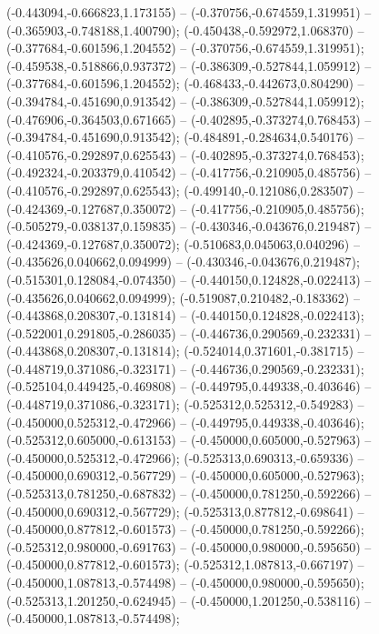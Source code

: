  (-0.443094,-0.666823,1.173155) -- (-0.370756,-0.674559,1.319951) -- (-0.365903,-0.748188,1.400790);
 (-0.450438,-0.592972,1.068370) -- (-0.377684,-0.601596,1.204552) -- (-0.370756,-0.674559,1.319951);
 (-0.459538,-0.518866,0.937372) -- (-0.386309,-0.527844,1.059912) -- (-0.377684,-0.601596,1.204552);
 (-0.468433,-0.442673,0.804290) -- (-0.394784,-0.451690,0.913542) -- (-0.386309,-0.527844,1.059912);
 (-0.476906,-0.364503,0.671665) -- (-0.402895,-0.373274,0.768453) -- (-0.394784,-0.451690,0.913542);
 (-0.484891,-0.284634,0.540176) -- (-0.410576,-0.292897,0.625543) -- (-0.402895,-0.373274,0.768453);
 (-0.492324,-0.203379,0.410542) -- (-0.417756,-0.210905,0.485756) -- (-0.410576,-0.292897,0.625543);
 (-0.499140,-0.121086,0.283507) -- (-0.424369,-0.127687,0.350072) -- (-0.417756,-0.210905,0.485756);
 (-0.505279,-0.038137,0.159835) -- (-0.430346,-0.043676,0.219487) -- (-0.424369,-0.127687,0.350072);
 (-0.510683,0.045063,0.040296) -- (-0.435626,0.040662,0.094999) -- (-0.430346,-0.043676,0.219487);
 (-0.515301,0.128084,-0.074350) -- (-0.440150,0.124828,-0.022413) -- (-0.435626,0.040662,0.094999);
 (-0.519087,0.210482,-0.183362) -- (-0.443868,0.208307,-0.131814) -- (-0.440150,0.124828,-0.022413);
 (-0.522001,0.291805,-0.286035) -- (-0.446736,0.290569,-0.232331) -- (-0.443868,0.208307,-0.131814);
 (-0.524014,0.371601,-0.381715) -- (-0.448719,0.371086,-0.323171) -- (-0.446736,0.290569,-0.232331);
 (-0.525104,0.449425,-0.469808) -- (-0.449795,0.449338,-0.403646) -- (-0.448719,0.371086,-0.323171);
 (-0.525312,0.525312,-0.549283) -- (-0.450000,0.525312,-0.472966) -- (-0.449795,0.449338,-0.403646);
 (-0.525312,0.605000,-0.613153) -- (-0.450000,0.605000,-0.527963) -- (-0.450000,0.525312,-0.472966);
 (-0.525313,0.690313,-0.659336) -- (-0.450000,0.690312,-0.567729) -- (-0.450000,0.605000,-0.527963);
 (-0.525313,0.781250,-0.687832) -- (-0.450000,0.781250,-0.592266) -- (-0.450000,0.690312,-0.567729);
 (-0.525313,0.877812,-0.698641) -- (-0.450000,0.877812,-0.601573) -- (-0.450000,0.781250,-0.592266);
 (-0.525312,0.980000,-0.691763) -- (-0.450000,0.980000,-0.595650) -- (-0.450000,0.877812,-0.601573);
 (-0.525312,1.087813,-0.667197) -- (-0.450000,1.087813,-0.574498) -- (-0.450000,0.980000,-0.595650);
 (-0.525313,1.201250,-0.624945) -- (-0.450000,1.201250,-0.538116) -- (-0.450000,1.087813,-0.574498);
